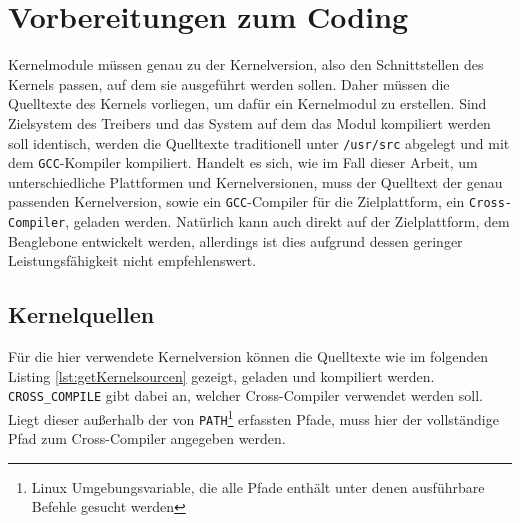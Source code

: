 \section{Vorbereitungen zum Coding} %
Kernelmodule müssen genau zu der Kernelversion, also den Schnittstellen des Kernels passen, auf dem sie ausgeführt werden sollen. Daher müssen die Quelltexte des Kernels vorliegen, um dafür ein Kernelmodul zu erstellen. Sind Zielsystem des Treibers und das System auf dem das Modul kompiliert werden soll identisch, werden die Quelltexte traditionell unter \texttt{/usr/src} abgelegt und mit dem \texttt{GCC}-Kompiler kompiliert.
Handelt es sich, wie im Fall dieser Arbeit, um unterschiedliche Plattformen und Kernelversionen, muss der Quelltext der genau passenden Kernelversion, sowie ein \texttt{GCC}-Compiler für die Zielplattform, ein \texttt{Cross-Compiler}, geladen werden. Natürlich kann auch direkt auf der Zielplattform, dem Beaglebone entwickelt werden, allerdings ist dies aufgrund dessen geringer Leistungsfähigkeit nicht empfehlenswert.

\subsection{Kernelquellen}
Für die hier verwendete Kernelversion können die Quelltexte wie im folgenden Listing \ref{lst:getKernelsourcen} gezeigt, geladen und kompiliert werden. \texttt{CROSS\_COMPILE} gibt dabei an, welcher Cross-Compiler verwendet werden soll. Liegt dieser außerhalb der von \texttt{PATH}\footnote{Linux Umgebungsvariable, die alle Pfade enthält unter denen ausführbare Befehle gesucht werden} erfassten Pfade, muss hier der vollständige Pfad zum Cross-Compiler angegeben werden.


